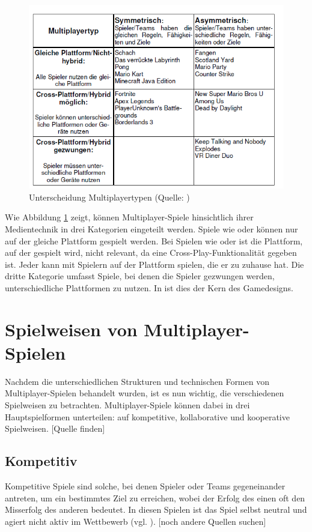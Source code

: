 \begin{figure}[ht]
\centering
\includegraphics[width=1\linewidth]{content/pictures/lotz_hybrid_multiplayer.PNG}
\caption{Unterscheidung Multiplayertypen (Quelle: \cite[S.6]{lotz_konzeption_2021})}
\label{fig:lotz_multiplayer_types}
\end{figure}

Wie Abbildung \ref{fig:lotz_multiplayer_types} zeigt, können Multiplayer-Spiele hinsichtlich ihrer Medientechnik in drei Kategorien eingeteilt werden.
Spiele wie  oder  können nur auf der gleiche Plattform gespielt werden. Bei Spielen wie  oder  ist die Plattform, auf der gespielt wird, nicht relevant, da eine Cross-Play-Funktionalität gegeben ist. Jeder kann mit Spielern auf der Plattform spielen, die er zu zuhause hat. Die dritte Kategorie umfasst Spiele, bei denen die Spieler gezwungen werden, unterschiedliche Plattformen zu nutzen. In  ist dies der Kern des Gamedesigns.

\section{Spielweisen von Multiplayer-Spielen}
Nachdem die unterschiedlichen Strukturen und technischen Formen von Multiplayer-Spielen behandelt wurden, ist es nun wichtig, die verschiedenen Spielweisen zu betrachten. Multiplayer-Spiele können dabei in drei Hauptspielformen unterteilen:
auf kompetitive, kollaborative und kooperative Spielweisen. [Quelle finden]

\subsection{Kompetitiv}
Kompetitive Spiele sind solche, bei denen Spieler oder Teams gegeneinander antreten, um ein bestimmtes Ziel zu erreichen, wobei der Erfolg des einen oft den Misserfolg des anderen bedeutet. In diesen Spielen ist das Spiel selbst neutral und agiert nicht aktiv im Wettbewerb (vgl. \cite{noauthor_game_2014}). [noch andere Quellen suchen]


